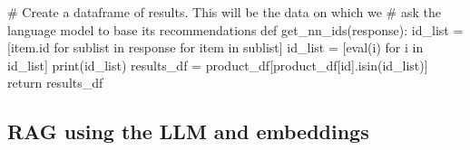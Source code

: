 \documentclass[
  letterpaper,
  DIV=11,
  numbers=noendperiod]{scrreprt}
\newenvironment{Shaded}{\begin{snugshade}}{\end{snugshade}}
\newcommand{\BuiltInTok}[1]{\textcolor[rgb]{0.00,0.23,0.31}{#1}}
\newcommand{\CommentTok}[1]{\textcolor[rgb]{0.37,0.37,0.37}{#1}}
\newcommand{\ControlFlowTok}[1]{\textcolor[rgb]{0.00,0.23,0.31}{#1}}
\newcommand{\KeywordTok}[1]{\textcolor[rgb]{0.00,0.23,0.31}{#1}}
\newcommand{\NormalTok}[1]{\textcolor[rgb]{0.00,0.23,0.31}{#1}}
\newcommand{\OperatorTok}[1]{\textcolor[rgb]{0.37,0.37,0.37}{#1}}
\newcommand{\StringTok}[1]{\textcolor[rgb]{0.13,0.47,0.30}{#1}}
\begin{document}
\begin{Shaded}
\begin{Highlighting}[]
\CommentTok{\# Create a dataframe of results. This will be the data on which we}
\CommentTok{\# ask the language model to base its recommendations}
\KeywordTok{def}\NormalTok{ get\_nn\_ids(response):}
\NormalTok{  id\_list }\OperatorTok{=}\NormalTok{ [item.}\BuiltInTok{id} \ControlFlowTok{for}\NormalTok{ sublist }\KeywordTok{in}\NormalTok{ response }\ControlFlowTok{for}\NormalTok{ item }\KeywordTok{in}\NormalTok{ sublist]}
\NormalTok{  id\_list }\OperatorTok{=}\NormalTok{ [}\BuiltInTok{eval}\NormalTok{(i) }\ControlFlowTok{for}\NormalTok{ i }\KeywordTok{in}\NormalTok{ id\_list]}
  \BuiltInTok{print}\NormalTok{(id\_list)}
\NormalTok{  results\_df }\OperatorTok{=}\NormalTok{ product\_df[product\_df[}\StringTok{\textquotesingle{}id\textquotesingle{}}\NormalTok{].isin(id\_list)]}
  \ControlFlowTok{return}\NormalTok{ results\_df}
\end{Highlighting}
\end{Shaded}

\hypertarget{rag-using-the-llm-and-embeddings}{%
\subsection{RAG using the LLM and
embeddings}\label{rag-using-the-llm-and-embeddings}}
\end{document}
